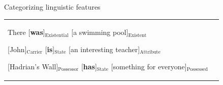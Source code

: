 \documentclass[10pt]{beamer}
\begin{document}
\begin{frame}{Categorizing linguistic features}
\begin{table}[!htb]
{\begin{tabular}{p{4cm}|p{11cm}}
         There [\textbf{was}]$_{\text{Existential}}$ [a swimming pool]$_{\text{Existent}}$ \newline
        
        [John]$_{\text{Carrier}}$ [\textbf{is}]$_{\text{State}}$ [an interesting teacher]$_{\text{Attribute}}$ \newline
        
        [Hadrian's Wall]$_{\text{Possessor}}$ [\textbf{has}]$_{\text{State}}$ [something for everyone]$_{\text{Possessed}}$ \\ %
    \end{tabular}}
    \label{tab:process_participants}
\end{table}
    
\end{frame}
\end{document}
